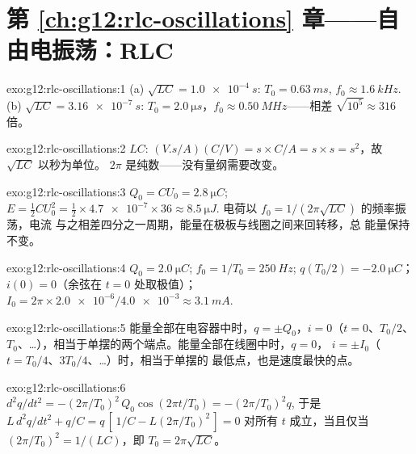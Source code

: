 \section*{第 \ref{ch:g12:rlc-oscillations} 章——自由电振荡：RLC}

\begin{solution}{exo:g12:rlc-oscillations:1}
(a) $\sqrt{LC} = \qty{1.0e-4}{s}$: $T_0 = \qty{0.63}{ms}$,
$f_0 \approx \qty{1.6}{kHz}$. (b) $\sqrt{LC} = \qty{3.16e-7}{s}$:
$T_0 = \qty{2.0}{\micro s}$，$f_0 \approx \qty{0.50}{MHz}$——相差
$\sqrt{10^5} \approx 316$ 倍。
\end{solution}

\begin{solution}{exo:g12:rlc-oscillations:2}
$LC$: $(\unit{V.s/A})(\unit{C/V}) = \unit{s} \times \unit{C/A} =
\unit{s} \times \unit{s} = \unit{s^2}$，故 $\sqrt{LC}$ 以秒为单位。
$2\pi$ 是纯数——没有量纲需要改变。
\end{solution}

\begin{solution}{exo:g12:rlc-oscillations:3}
$Q_0 = CU_0 = \qty{2.8}{\micro C}$; $E = \tfrac12 CU_0^2 =
\tfrac12 \times \num{4.7e-7} \times 36 \approx \qty{8.5}{\micro J}$.
电荷以 $f_0 = 1/(2\pi\sqrt{LC})$ 的频率振荡，电流
与之相差四分之一周期，能量在极板与线圈之间来回转移，总
能量保持不变。
\end{solution}

\begin{solution}{exo:g12:rlc-oscillations:4}
$Q_0 = \qty{2.0}{\micro C}$; $f_0 = 1/T_0 = \qty{250}{Hz}$;
$q(T_0/2) = \qty{-2.0}{\micro C}$；$i(0) = 0$（余弦在 $t=0$ 处取极值）；
$I_0 = 2\pi \times \num{2.0e-6}/\num{4.0e-3} \approx \qty{3.1}{mA}$.
\end{solution}

\begin{solution}{exo:g12:rlc-oscillations:5}
能量全部在电容器中时，$q = \pm Q_0$，$i = 0$（$t = 0$、$T_0/2$、
$T_0$、\dots），相当于单摆的两个端点。能量全部在线圈中时，$q = 0$，
$i = \pm I_0$（$t = T_0/4$、$3T_0/4$、\dots）时，相当于单摆的
最低点，也是速度最快的点。
\end{solution}

\begin{solution}{exo:g12:rlc-oscillations:6}
$d^2q/dt^2 = -(2\pi/T_0)^2\,Q_0\cos(2\pi t/T_0) = -(2\pi/T_0)^2 q$,
于是 $L\,d^2q/dt^2 + q/C = q\,[\,1/C - L(2\pi/T_0)^2\,] = 0$ 对所有 $t$
成立，当且仅当 $(2\pi/T_0)^2 = 1/(LC)$，即 $T_0 = 2\pi\sqrt{LC}$。
\end{solution}

